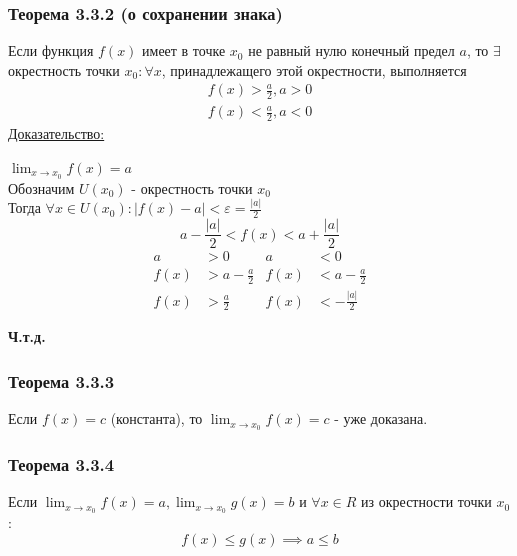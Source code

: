 \documentclass[12pt]{article}
\begin{document}
    \subsubsection*{Теорема 3.3.2 (о сохранении знака)}\label{th:3.3.2}
    Если функция $f(x)$ имеет в точке $x_0$ не равный нулю конечный предел $a$, то $\exists$ окрестность точки $x_0 : \forall x$, принадлежащего этой окрестности, выполняется
    \begin{gather*}
        f(x) > \frac{a}{2}, a > 0\\
        f(x) < \frac{a}{2}, a < 0
    \end{gather*}
    \underline{Доказательство:}
    \begin{adjustwidth}{1.5em}{1.5em}
        $\lim_{x\to x_0}f(x) = a$\\
        Обозначим $U(x_0)$ - окрестность точки $x_0$\\
        Тогда $\forall x \in U(x_0) : |f(x) - a| < \varepsilon = \frac{|a|}{2}$
        \[a - \frac{|a|}{2} < f(x) < a + \frac{|a|}{2}\]
        \begin{align*}
            a &> 0 & a &< 0\\
            f(x) &> a - \frac{a}{2} & f(x) &< a - \frac{a}{2}\\
            f(x) &> \frac{a}{2} & f(x) &< -\frac{|a|}{2}
        \end{align*}
        \begin{center}
            \textbf{Ч.т.д.}
        \end{center}
    \end{adjustwidth}

    \subsubsection*{Теорема 3.3.3}\label{th:3.3.3}
    Если $f(x) = c$ (константа), то $\lim_{x\to x_0}f(x) = c$ - уже доказана.
    
    \subsubsection*{Теорема 3.3.4}\label{th:3.3.4}
    Если $\lim_{x\to x_0}f(x) = a, \lim_{x \to x_0}g(x) = b$ и $\forall x \in R$ из окрестности точки $x_0$:
    \[ f(x) \le g(x) \implies a \le b \]
    
\end{document}
